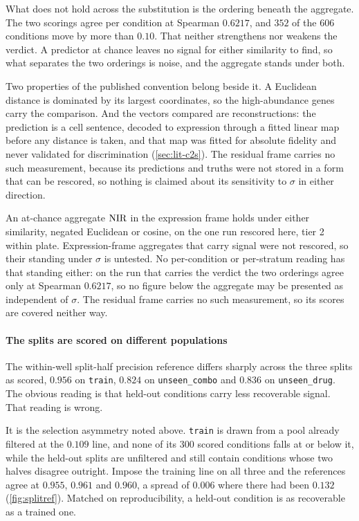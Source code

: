 What does not hold across the substitution is the ordering beneath the
aggregate. The two scorings agree per condition at Spearman $0.6217$, and $352$
of the $606$ conditions move by more than $0.10$. That neither strengthens nor
weakens the verdict. A predictor at chance leaves no signal for either
similarity to find, so what separates the two orderings is noise, and the
aggregate stands under both.

Two properties of the published convention belong beside it. A Euclidean
distance is dominated by its largest coordinates, so the high-abundance genes
carry the comparison. And the vectors compared are reconstructions: the
prediction is a cell sentence, decoded to expression through a fitted linear map
before any distance is taken, and that map was fitted for absolute fidelity and
never validated for discrimination (\cref{sec:lit-c2s}). The residual frame
carries no such measurement, because its predictions and truths were not stored
in a form that can be rescored, so nothing is claimed about its sensitivity to
$\sigma$ in either direction.

\begin{scopelimit}
An at-chance aggregate $\textrm{NIR}$ in the expression frame holds under either
similarity, negated Euclidean or cosine, on the one run rescored here, tier 2
within plate. Expression-frame aggregates that carry signal were not rescored,
so their standing under $\sigma$ is untested. No per-condition or per-stratum
reading has that standing either: on the run that carries the verdict the two
orderings agree only at Spearman $0.6217$, so no figure below the aggregate may
be presented as independent of $\sigma$. The residual frame carries no such
measurement, so its scores are covered neither way.
\end{scopelimit}

\paragraph{The splits are scored on different populations} The within-well
split-half precision reference differs sharply across the three splits as
scored, $0.956$ on \texttt{train}, $0.824$ on \texttt{unseen\_combo} and $0.836$
on \texttt{unseen\_drug}. The obvious reading is that held-out conditions carry
less recoverable signal. That reading is wrong.

It is the selection asymmetry noted above. \texttt{train} is drawn from a pool
already filtered at the $0.109$ line, and none of its $300$ scored conditions
falls at or below it, while the held-out splits are unfiltered and still contain
conditions whose two halves disagree outright. Impose the training line on all
three and the references agree at $0.955$, $0.961$ and $0.960$, a spread of
$0.006$ where there had been $0.132$ (\cref{fig:splitref}). Matched on
reproducibility, a held-out condition is as recoverable as a trained one.

